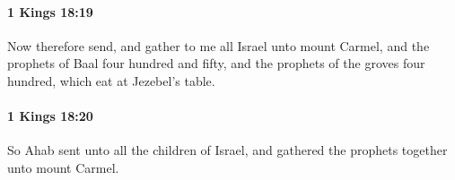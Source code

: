 		\paragraph{1 Kings 18:19} %
			\label{1KINGS-18-19}

			Now therefore send, and gather to me all Israel unto mount Carmel, and the prophets of Baal four hundred and fifty, and the prophets of the groves four hundred, which eat at Jezebel’s table.


		\paragraph{1 Kings 18:20} %
			\label{1KINGS-18-20}

			So Ahab sent unto all the children of Israel, and gathered the prophets together unto mount Carmel.


